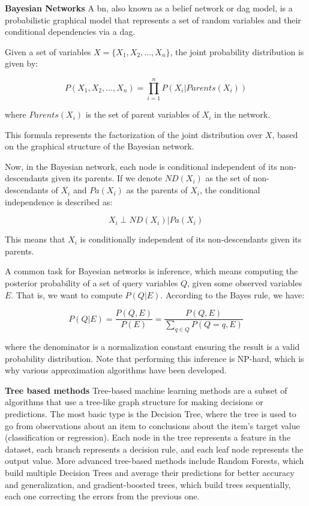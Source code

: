\textbf{Bayesian Networks}
A \ac{bn}, also known as a belief network or \ac{dag} model, is a probabilistic graphical model that represents a set of random variables and their conditional dependencies via a \ac{dag}. 

Given a set of variables \(X = \{X_1, X_2, ..., X_n\}\), the joint probability distribution is given by:

\[
P(X_1, X_2, ..., X_n) = \prod_{i=1}^{n} P(X_i | Parents(X_i))
\]

where \(Parents(X_i)\) is the set of parent variables of \(X_i\) in the network.

This formula represents the factorization of the joint distribution over \(X\), based on the graphical structure of the Bayesian network.

Now, in the Bayesian network, each node is conditional independent of its non-descendants given its parents. If we denote \(ND(X_i)\) as the set of non-descendants of \(X_i\) and \(Pa(X_i)\) as the parents of \(X_i\), the conditional independence is described as:

\[
X_i \perp ND(X_i) | Pa(X_i)
\]

This means that \(X_i\) is conditionally independent of its non-descendants given its parents. 

A common task for Bayesian networks is inference, which means computing the posterior probability of a set of query variables \(Q\), given some observed variables \(E\). That is, we want to compute \(P(Q|E)\). According to the Bayes rule, we have:

\[
P(Q|E) = \frac{P(Q,E)}{P(E)} = \frac{P(Q,E)}{\sum_{q \in Q} P(Q=q,E)}
\]

where the denominator is a normalization constant ensuring the result is a valid probability distribution. Note that performing this inference is NP-hard, which is why various approximation algorithms have been developed.

\textbf{Tree based methods}
Tree-based machine learning methods are a subset of algorithms that use a tree-like graph structure for making decisions or predictions. The most basic type is the Decision Tree, where the tree is used to go from observations about an item to conclusions about the item's target value (classification or regression). Each node in the tree represents a feature in the dataset, each branch represents a decision rule, and each leaf node represents the output value. More advanced tree-based methods include Random Forests, which build multiple Decision Trees and average their predictions for better accuracy and generalization, and gradient-boosted trees, which build trees sequentially, each one correcting the errors from the previous one.

